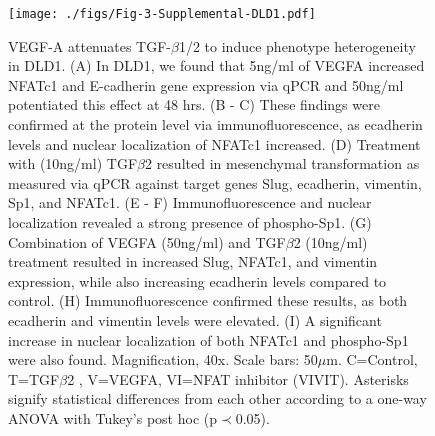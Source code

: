 \documentclass[12pt]{article}
\begin{document}
\begin{figure}
\texttt{[image: ./figs/Fig-3-Supplemental-DLD1.pdf]}
\caption{VEGF-A attenuates TGF-$\beta$1/2 to induce phenotype heterogeneity in DLD1.
(A) In DLD1, we found that 5ng/ml of VEGFA increased NFATc1 and E-cadherin gene expression via qPCR and 50ng/ml potentiated this effect at 48 hrs.
(B - C) These findings were confirmed at the protein level via immunofluorescence, as ecadherin levels and nuclear localization of NFATc1 increased.
(D) Treatment with (10ng/ml) TGF$\beta$2 resulted in mesenchymal transformation as measured via qPCR against target genes Slug, ecadherin, vimentin, Sp1, and NFATc1.
(E - F) Immunofluorescence and nuclear localization revealed a strong presence of phospho-Sp1.
(G) Combination of VEGFA (50ng/ml) and TGF$\beta$2 (10ng/ml) treatment resulted in increased Slug, NFATc1, and vimentin expression, while also increasing ecadherin levels compared to control.
(H) Immunofluorescence confirmed these results, as both ecadherin and vimentin levels were elevated.
(I) A significant increase in nuclear localization of both NFATc1 and phospho-Sp1 were also found.
Magnification, 40x. Scale bars: 50$\mu$m.  C=Control, T=TGF$\beta$2 , V=VEGFA, VI=NFAT inhibitor (VIVIT).
Asterisks signify statistical differences from each other according to a one-way ANOVA with Tukey's post hoc (p$\prec$0.05).}\label{fg:S3}
\end{figure}
\end{document}
